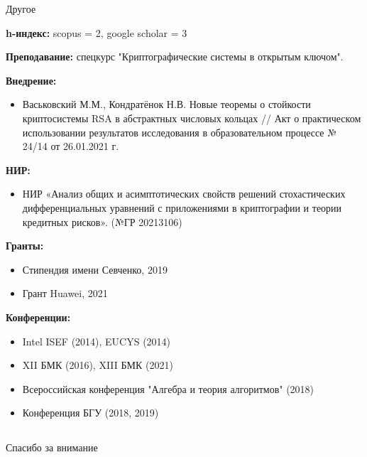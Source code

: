 \documentclass[8pt, xcolor=x11names]{beamer}
\begin{document}
\begin{frame}{Другое}
    \begin{small}
        {\bf h-индекс:} scopus = 2, google scholar = 3
        
        {\bf Преподавание:} спецкурс "Криптографические системы в открытым ключом".

        {\bf Внедрение:}
        \begin{itemize}
            \item Васьковский М.М., Кондратёнок Н.В. Новые теоремы о стойкости криптосистемы RSA в абстрактных числовых кольцах // Акт о практическом использовании результатов исследования в образовательном процессе № 24/14 от 26.01.2021 г.
        \end{itemize}
    
        {\bf НИР:}
        \begin{itemize}
            \item НИР «Анализ общих и асимптотических свойств решений стохастических дифференциальных уравнений с приложениями в криптографии и теории кредитных рисков». (№ГР 20213106)
        \end{itemize}
    
        {\bf Гранты:}
        \begin{itemize}
            \item Стипендия имени Севченко, 2019
    
            \item Грант Huawei, 2021
        \end{itemize}
        
        {\bf Конференции:}
        \begin{itemize}
            \item Intel ISEF (2014), EUCYS (2014)
            
            \item XII БМК (2016), XIII БМК (2021)
    
            \item Всероссийская конференция "Алгебра и теория алгоритмов" (2018)
    
            \item Конференция БГУ (2018, 2019)
        \end{itemize}
    \end{small}
\end{frame}

\subsection{}

\begin{frame}
    \begin{center}
        \begin{huge}
            Спасибо за внимание
        \end{huge}
    \end{center}
\end{frame}
\end{document}
